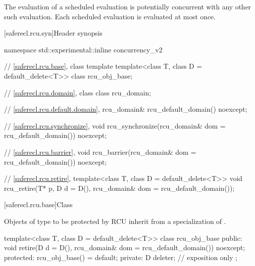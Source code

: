 \pnum
The evaluation of a scheduled evaluation is potentially concurrent with
any other such evaluation. Each scheduled evaluation is evaluated at
most once.

[saferecl.rcu.syn]{Header  synopsis}


\begin{codeblock}
namespace std::experimental::inline concurrency_v2 {
  // \ref{saferecl.rcu.base}, class template 
  template<class T, class D = default_delete<T>>
    class rcu_obj_base;

  // \ref{saferecl.rcu.domain}, class 
  class rcu_domain;

  // \ref{saferecl.rcu.default.domain}, 
  rcu_domain& rcu_default_domain() noexcept;

  // \ref{saferecl.rcu.synchronize}, 
  void rcu_synchronize(rcu_domain& dom = rcu_default_domain()) noexcept;

  // \ref{saferecl.rcu.barrier}, 
  void rcu_barrier(rcu_domain& dom = rcu_default_domain()) noexcept;

  // \ref{saferecl.rcu.retire}, 
  template<class T, class D = default_delete<T>>
    void rcu_retire(T* p, D d = D(), rcu_domain& dom = rcu_default_domain());
}
\end{codeblock}

[saferecl.rcu.base]{Class }


Objects of type  to be protected by RCU inherit from a
specialization of .


\begin{codeblock}
template<class T, class D = default_delete<T>>
class rcu_obj_base {
public:
  void retire(D d = D(), rcu_domain& dom = rcu_default_domain()) noexcept;
protected:
  rcu_obj_base() = default;
private:
  D deleter;  // exposition only
};
\end{codeblock}

